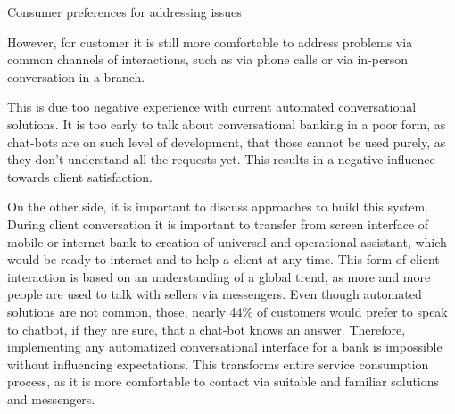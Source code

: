 \begin{table}
    \centering
    \caption{Consumer preferences for addressing issues}
    \medskip
\end{table}
    
However, for customer it is still more comfortable to address problems via common channels of interactions, such as via phone calls or via in-person conversation in a branch.
\cite{humley_banking_report}

This is due too negative experience with current automated conversational solutions.
It is too early to talk about conversational banking in a poor form, as chat-bots are on such level of development, that those cannot be used purely, as they don't understand all the requests yet.
This results in a negative influence towards client satisfaction.

On the other side, it is important to discuss approaches to build this system.
During client conversation it is important to transfer from screen interface of mobile or internet-bank to creation of universal and operational assistant, which would be ready to interact and to help a client at any time.
This form of client interaction is based on an understanding of a global trend, as more and more people are used to talk with sellers via messengers.
Even though automated solutions are not common, those, nearly 44\% of customers would prefer to speak to chatbot, if they are sure, that a chat-bot knows an answer.
\cite{humley_banking_report}
Therefore, implementing any automatized conversational interface for a bank is impossible without influencing expectations.
This transforms entire service consumption process, as it is more comfortable to contact via suitable and familiar solutions and messengers.

